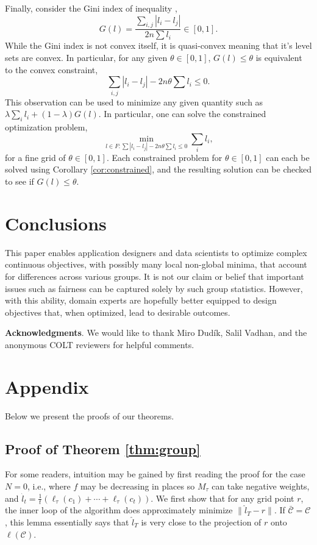 \documentclass[final, 12pt]{colt2018} %
\def\calC{\mathcal{C}}
\begin{document}
Finally, consider the Gini index of inequality \citep{gini1912variabilita},
$$G(l)=\frac{\sum_{i,j} |l_i-l_j|}{2n\sum l_i} \in [0,1].$$ While the Gini index is not convex itself, it is quasi-convex meaning that it's level sets are convex. In particular, for any given $\theta\in [0,1]$, $G(l) \leq \theta$ is equivalent to the convex constraint,
$$\sum_{i,j} |l_i-l_j|-2n\theta \sum l_i\leq 0.$$
This observation can be used to minimize any given quantity such as $\lambda \sum_i l_i + (1-\lambda) G(l)$. In particular, one can solve the constrained optimization problem,
$$\min_{l\in F:\sum |l_i-l_j|-2n\theta \sum l_i \leq 0} \sum_i l_i,$$ 
for a fine grid of $\theta \in [0,1]$. Each constrained problem for $\theta\in [0,1]$ can each be solved using Corollary \ref{cor:constrained}, and the resulting solution can be checked to see if $G(l)\leq \theta$.




\section{Conclusions}

This paper enables application designers and data scientists to optimize complex continuous objectives, with possibly many local non-global minima, that account for differences across various groups. It is not our claim or belief that important issues such as fairness can be captured solely by such group statistics. However, with this ability, domain experts are hopefully better equipped to design objectives that, when optimized, lead to desirable outcomes.

\medskip \noindent \textbf{Acknowledgments}. We would like to thank Miro Dudík, Salil Vadhan, and the anonymous COLT reviewers for helpful comments.



\section{Appendix}
Below we present the proofs of our theorems.


\subsection{Proof of Theorem \ref{thm:group}}\label{ap:proof:thm:group}

For some readers, intuition may be gained by first reading the proof for the  case $N=0$, i.e., where $f$ may be decreasing in places so $M_\tau$ can take negative weights, and $\hat{l}_t = \frac{1}{t}(\ell_\tau(c_1)+\cdots+\ell_\tau(c_t))$. We first show that for any grid point $r$, the inner loop of the algorithm does approximately minimize $\|\hat{l}_T-r\|$. If $\bar{\calC}= \calC$, this lemma essentially says that $\hat{l}_T$ is very close to the projection of $r$ onto $\ell(\calC)$. 
\end{document}
